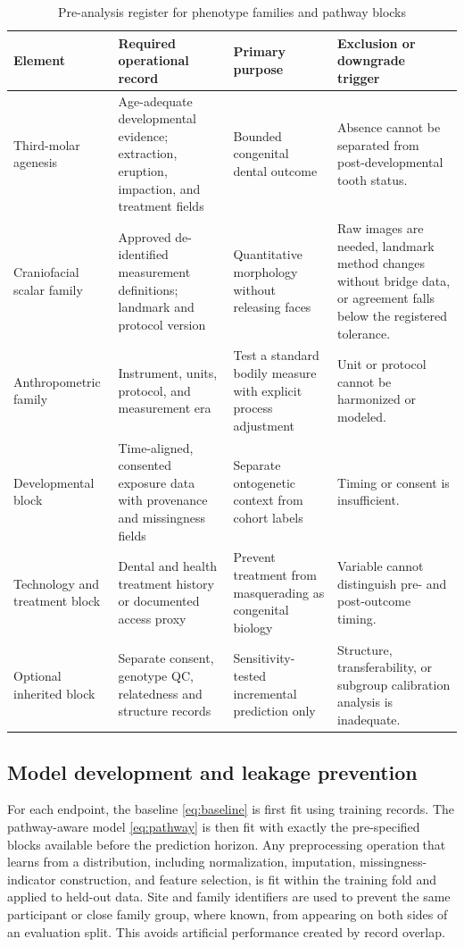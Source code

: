 \documentclass[conference]{IEEEtran}
\begin{document}
\begin{table}[t]
\caption{Pre-analysis register for phenotype families and pathway blocks}
\label{tab:register}
\centering
\footnotesize
\begin{tabular}{p{}p{}p{}p{}}
\toprule
Element & Required operational record & Primary purpose & Exclusion or downgrade trigger \\
\midrule
Third-molar agenesis & Age-adequate developmental evidence; extraction, eruption, impaction, and treatment fields & Bounded congenital dental outcome & Absence cannot be separated from post-developmental tooth status. \\
Craniofacial scalar family & Approved de-identified measurement definitions; landmark and protocol version & Quantitative morphology without releasing faces & Raw images are needed, landmark method changes without bridge data, or agreement falls below the registered tolerance. \\
Anthropometric family & Instrument, units, protocol, and measurement era & Test a standard bodily measure with explicit process adjustment & Unit or protocol cannot be harmonized or modeled. \\
Developmental block & Time-aligned, consented exposure data with provenance and missingness fields & Separate ontogenetic context from cohort labels & Timing or consent is insufficient. \\
Technology and treatment block & Dental and health treatment history or documented access proxy & Prevent treatment from masquerading as congenital biology & Variable cannot distinguish pre- and post-outcome timing. \\
Optional inherited block & Separate consent, genotype QC, relatedness and structure records & Sensitivity-tested incremental prediction only & Structure, transferability, or subgroup calibration analysis is inadequate. \\
\bottomrule
\end{tabular}
\end{table}

\subsection{Model development and leakage prevention}

For each endpoint, the baseline \eqref{eq:baseline} is first fit using
training records. The pathway-aware model \eqref{eq:pathway} is then fit with
exactly the pre-specified blocks available before the prediction horizon. Any
preprocessing operation that learns from a distribution, including
normalization, imputation, missingness-indicator construction, and feature
selection, is fit within the training fold and applied to held-out data. Site
and family identifiers are used to prevent the same participant or close
family group, where known, from appearing on both sides of an evaluation
split. This avoids artificial performance created by record overlap.
\end{document}
